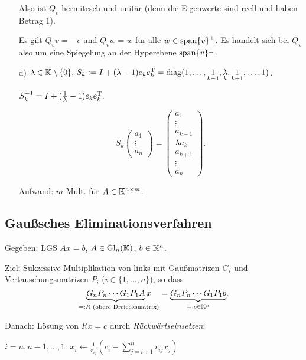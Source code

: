 \begin{Beispiele}[Elementarmatrizen]
\begin{itemize}
  Also ist $Q_v$ hermitesch und unitär (denn die Eigenwerte sind reell und
  haben Betrag 1).

  Es gilt $Q_v v = -v$ und $Q_v w = w$ für alle $w \in \operatorname*{\mathrm{span}}\{v\}^\perp$.
  Es handelt sich bei $Q_v$ also um eine Spiegelung an der Hyperebene
  $\operatorname*{\mathrm{span}}\{v\}^\perp$.

  \item[d)] \(
    \lambda \in \KK \setminus \{0\}$, $S_k := I + (\lambda - 1)e_ke_k^\T
      = \diag(1, \ldots, \underset{k-1}{1}, \underset{k}{\lambda}, \underset{k+1}{1}, \ldots, 1)
    \).

    $S_k^{-1} = I + (\frac{1}{\lambda} - 1) e_k e_k^\mathrm T.$

    \[
      S_k \begin{pmatrix} a_1 \\ \vdots \\ a_n \end{pmatrix}
        = \begin{pmatrix} a_1 \\ \vdots \\ a_{k-1} \\ \lambda a_k \\ a_{k+1} \\ \vdots \\ a_n \end{pmatrix}.
    \]

    Aufwand: $m$ Mult. für $A \in \mathbb K^{n\times m}$.
\end{itemize}
\end{Beispiele}

\subsection{Gaußsches Eliminationsverfahren}

Gegeben: LGS $Ax = b$, $A \in \mathrm{Gl}_n(\mathbb K)$, $b \in \mathbb K^n$.

Ziel: Sukzessive Multiplikation von links mit Gaußmatrizen $G_i$ und Vertauschungsmatrizen $P_i$ ($i \in \{1, \ldots, n\}$),
so dass \[
  \underset{=: R\text{ (obere Dreiecksmatrix)}}{\underbrace{
    G_nP_n \cdots G_1 P_1 A}x}
  = \underset{=: c \in \mathbb K^n}{\underbrace{
    G_nP_n \cdots G_1 P_1 b}}.
\]

Danach: Lösung von $Rx = c$ durch \emph{Rückwärtseinsetzen}:
\begin{codebox}
  \li \For $i = n, n-1, \ldots, 1$:
    \Do
      \li $x_i \gets \frac{1}{r_{ij}} \left( c_i - \sum_{j=i+1}^n r_{ij} x_j \right)$
    \End
\end{codebox}

